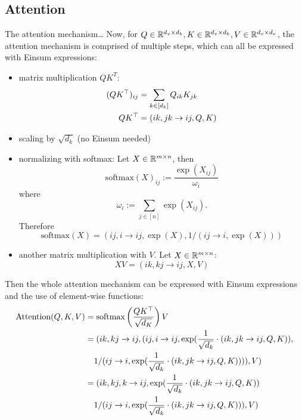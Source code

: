 \subsection{Attention}
The attention mechanism\dots
Now, for $Q \in \mathbb{R}^{d_v \times d_k}, K \in \mathbb{R}^{d_v \times d_k}, V \in \mathbb{R}^{d_v \times d_v}$, the attention mechanism is comprised of multiple steps, which can all be expressed with Einsum expressions:
\begin{itemize}
    \item matrix multiplication $Q K^T$:
          \begin{align*}
              (QK^\top)_{ij} & = \sum\limits_{k \in [d_k]} Q_{ik} K_{jk} \\
              QK^\top        & = (ik, jk \rightarrow ij, Q, K)
          \end{align*}
    \item scaling by $\sqrt{d_k}$ (no Einsum needed)
    \item normalizing with softmax: Let $X \in \mathbb{R}^{m \times n}$, then
          $$\text{softmax}(X)_{ij} := \frac{\exp(X_{ij})}{\omega_i}$$
          where
          $$\omega_i := \sum\limits_{j \in [n]} \exp(X_{ij}).$$
          Therefore
          $$\text{softmax}(X) = (ij, i \rightarrow ij, \exp(X), 1 / (ij \rightarrow i, \exp(X)))$$
    \item another matrix multiplication with $V$. Let $X \in \mathbb{R}^{m \times n}$:
          $$X V = (ik, kj \rightarrow ij, X, V)$$
\end{itemize}

Then the whole attention mechanism can be expressed with Einsum expressions and the use of element-wise functions:
\begin{align*}
    \text{Attention}(Q, K, V) & = \text{softmax}\left(\frac{Q K^\T}{\sqrt{d_K}}\right)V                                                          \\
                              & = (ik, kj \rightarrow ij, (ij, i \rightarrow ij, \exp(\frac{1}{\sqrt{d_k}} \cdot (ik, jk \rightarrow ij, Q, K)), \\
                              & \phantom{{}=} 1 / (ij \rightarrow i, \exp(\frac{1}{\sqrt{d_k}} \cdot (ik, jk \rightarrow ij, Q, K)))), V)        \\
                              & = (ik, kj, k \rightarrow ij, \exp(\frac{1}{\sqrt{d_k}} \cdot (ik, jk \rightarrow ij, Q, K))                      \\
                              & \phantom{{}=} 1 / (ij \rightarrow i, \exp(\frac{1}{\sqrt{d_k}} \cdot (ik, jk \rightarrow ij, Q, K))), V)
\end{align*}


